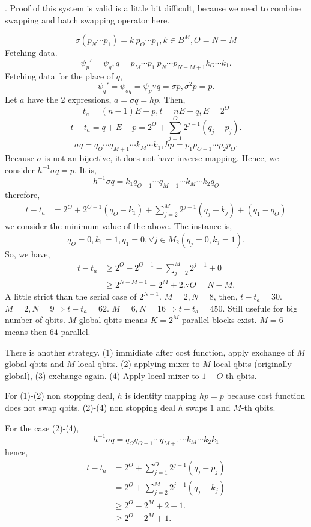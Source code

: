 \documentclass[a4paper]{article}
\newenvironment{XA}
  {\color[rgb]{0.4,0.0,0.1}.}
  {}
\begin{document}
\begin{XA}
Proof of this system is valid is a little bit difficult, because we need to combine swapping and batch swapping operator here.

\[
\sigma(p_N \cdots p_1) = k\ p_O\cdots p_1, k\in B^M, O = N-M
\]
Fetching data.
\[
\psi_{p}' = \psi_{q}, q = p_M \cdots p_1\ p_N\cdots p_{N-M + 1} k_O \cdots k_1.
\]
Fetching data for the place of \(q\), 
\[
\psi_{q}' = \psi_{\sigma q} = \psi_{p} \because q = \sigma p, \sigma^2 p = p.
\]
Let \(a\) have the 2 expressions, \(a = \sigma q = h p\). Then, 
\[
    t_a = (n-1)E + p, t = n E  + q, E = 2^{O}
\] 
\[
    t - t_a = q + E - p  = 2^O + \sum_{j=1}^O 2^{j-1}(q_j-p_j).
\]
\[
\sigma q = q_O\cdots q_{M+1} \cdots k_M\cdots k_1, hp = p_1 p_{O-1}\cdots p_2 p_O.
\]
Because \(\sigma\) is not an bijective, it does not have inverse mapping. Hence, we consider \(h^{-1}\sigma q =  p\). It is,
\[
 h^{-1}\sigma q  = k_1 q_{O-1}\cdots q_{M+1} \cdots k_M\cdots k_2 q_O
\]
therefore, 
\begin{align*}
 t - t_a &= 2^O + 2^{O-1} (q_O - k_1) + \sum_{j=2}^{M} 2^{j-1}(q_j-k_j) + (q_1 - q_O) 
\end{align*}
we consider the minimum value of the above. The instance is, 
\[
q_O = 0, k_1 = 1, q_1 = 0, \forall j\in M_2(q_j = 0, k_j = 1).
\]
So, we have, 
\begin{align*}
 t - t_a &\geq 2^O - 2^{O-1} - \sum_{j=2}^{M} 2^{j-1} + 0 \\
 &\geq 2^{N-M-1} - 2^{M} + 2. \because O = N-M.
\end{align*}
A little strict than the serial case of \(2^{N-1}\). \(M=2, N = 8\), then, \(t - t_a = 30.\) \(M=2, N=9 \Rightarrow t-t_a = 62\). \(M=6, N=16 \Rightarrow t-t_a = 450\). Still usefule for big number of qbits. \(M\) global qbits means \(K=2^M\) parallel blocks exist. \(M=6\) means then \(64\) parallel. 

There is another strategy. (1) immidiate after cost function, apply exchange of \(M\) global qbits and \(M\) local qbits. (2) applying mixer to \(M\) local qbits (originally global), (3) exchange again. (4) Apply local mixer to \(1-O\)-th qbits.

For (1)-(2) non stopping deal, \(h\) is identity mapping \(hp=p\) because cost function does not swap qbits. (2)-(4) non stopping deal \(h\) swaps \(1\) and \(M\)-th qbits. 

For the case (2)-(4), 
\[
h^{-1}\sigma q  = q_O q_{O-1}\cdots q_{M+1} \cdots k_M \cdots k_2 k_1
\]
hence, 
\begin{align*}
 t - t_a &= 2^O + \sum_{j=1}^{O} 2^{j-1}(q_j-p_j) \\
 &= 2^O + \sum_{j=2}^{M} 2^{j-1}(q_j-k_j)\\
 &\geq 2^O - 2^{M} + 2 - 1.\\
 &\geq 2^O - 2^{M} + 1.\\
\end{align*}


\end{XA}
\end{document}
